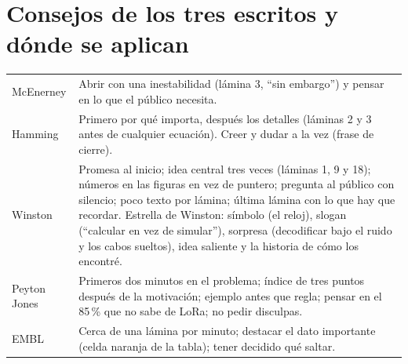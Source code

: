 \documentclass[10pt,letterpaper]{extarticle}
\begin{document}
\section*{Consejos de los tres escritos y dónde se aplican}
\begin{tabularx}{\linewidth}{@{}lX@{}}
\toprule
McEnerney & Abrir con una inestabilidad (lámina 3, “sin embargo”) y pensar en lo que el público necesita. \\
Hamming & Primero por qué importa, después los detalles (láminas 2 y 3 antes de cualquier ecuación). Creer y dudar a la
vez (frase de cierre). \\
Winston & Promesa al inicio; idea central tres veces (láminas 1, 9 y 18); números en las figuras en vez de puntero;
pregunta al público con silencio; poco texto por lámina; última lámina con lo que hay que recordar. Estrella de Winston:
símbolo (el reloj), slogan (“calcular en vez de simular”), sorpresa (decodificar bajo el ruido y los cabos sueltos),
idea saliente y la historia de cómo los encontré. \\
Peyton Jones & Primeros dos minutos en el problema; índice de tres puntos después de la motivación; ejemplo antes que
regla; pensar en el 85\,\% que no sabe de LoRa; no pedir disculpas. \\
EMBL & Cerca de una lámina por minuto; destacar el dato importante (celda naranja de la tabla); tener decidido qué
saltar. \\
\bottomrule
\end{tabularx}
\end{document}
